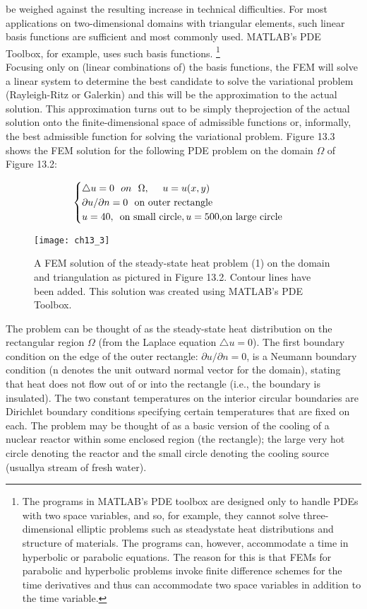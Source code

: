 \documentclass[../main.tex]{subfiles}
\begin{document}
be weighed against the resulting increase in technical difficulties. For most 
applications on two-dimensional domains with triangular elements, such linear 
basis functions are sufficient and most commonly used. MATLAB's PDE Toolbox, for example, uses such basis functions.
\footnote{The programs in MATLAB's PDE toolbox are designed only to handle PDEs with two space 
variables, and so, for example, they cannot solve three-dimensional elliptic problems such as steadystate heat distributions and structure of materials. The programs can, however, accommodate a time  in hyperbolic or parabolic equations. The reason for this is that FEMs for parabolic and hyperbolic problems invoke finite difference schemes for the time derivatives and thus can accommodate two space variables in addition to the time variable. }
\\
Focusing only on (linear combinations of) the basis functions, the FEM will solve 
a linear system to determine the best candidate to solve the variational problem 
(Rayleigh-Ritz or Galerkin) and this will be the approximation to the actual solution. This approximation turns out to be simply theprojection of the actual solution onto the finite-dimensional space of admissible functions or, informally, the best admissible function for solving the variational problem. Figure 13.3 shows the FEM solution for the following PDE problem on the domain $\Omega$ of 
Figure 13.2: 

\begin{equation} \label{eqa1}
\begin{cases}
\bigtriangleup u=0~~on~~\Omega, ~~~~u=u(x,y)\\
		\partial u/\partial n=0 ~~$on outer rectangle$\\
		u=40, ~~ $on small circle$, u = 500 , $on large circle$
\end{cases}
\end{equation}

\begin{figure}[H]
	\centering
	\texttt{[image: ch13\_3]}
	\caption{\textsf{A FEM solution of the steady-state heat problem (1) on the domain and triangulation as pictured in Figure 13.2. Contour lines have been added. This solution was created using MATLAB's PDE Toolbox.}}
	\label{pfig:ch13_3}
\end{figure}

The problem can be thought of as the steady-state heat distribution on the rectangular region $\Omega$ (from the Laplace equation $\bigtriangleup u = 0$). The first boundary condition on the edge of the outer rectangle: $\partial u /\partial n=0$, is a Neumann boundary condition (n denotes the unit outward normal vector for the domain), stating that heat does not flow out of or into the rectangle (i.e., the boundary is insulated). The two constant temperatures on the interior circular boundaries are Dirichlet boundary conditions specifying certain temperatures that are fixed on each. The problem may be thought of as a basic version of the cooling of a nuclear reactor within some enclosed region (the rectangle); the large very hot circle denoting the reactor and the small circle denoting the cooling source (usuallya stream of fresh water). 
\\
\end{document}
